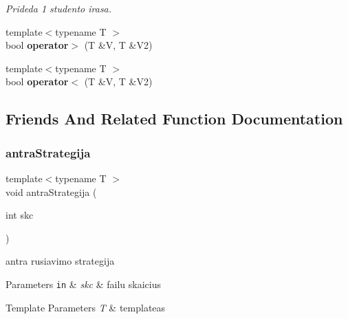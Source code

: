 \begin{DoxyCompactItemize}
\begin{DoxyCompactList}\small\item\em Prideda 1 studento irasa. \end{DoxyCompactList}\item 
\mbox{\label{classnode_a0457c926fdc3d3cbf0ee29df7c6e875f}} 
{\footnotesize template$<$typename T $>$ }\\bool {\bfseries operator$>$} (T \&V, T \&V2)
\item 
\mbox{\label{classnode_a64ca1c8d045d2cb38575e5938ca8f67e}} 
{\footnotesize template$<$typename T $>$ }\\bool {\bfseries operator$<$} (T \&V, T \&V2)
\end{DoxyCompactItemize}


\subsection{Friends And Related Function Documentation}
\mbox{\label{classnode_a097205487c0c52bf33282a17ae3e08cb}} 
\subsubsection{\texorpdfstring{antra\+Strategija}{antraStrategija}}
{\footnotesize\ttfamily template$<$typename T $>$ \\
void antra\+Strategija (\begin{DoxyParamCaption}\item[{int}]{skc }\end{DoxyParamCaption})\hspace{0.3cm}{\ttfamily [friend]}}



antra rusiavimo strategija 


\begin{DoxyParams}[1]{Parameters}
\mbox{\tt in}  & {\em skc} & failu skaicius\\
\hline
\end{DoxyParams}

\begin{DoxyTemplParams}{Template Parameters}
{\em T} & template\textquotesingle{}as \\
\hline
\end{DoxyTemplParams}
\mbox{\label{classnode_a7e23b4a662a606c67e6cbc8deae68dbd}} 
